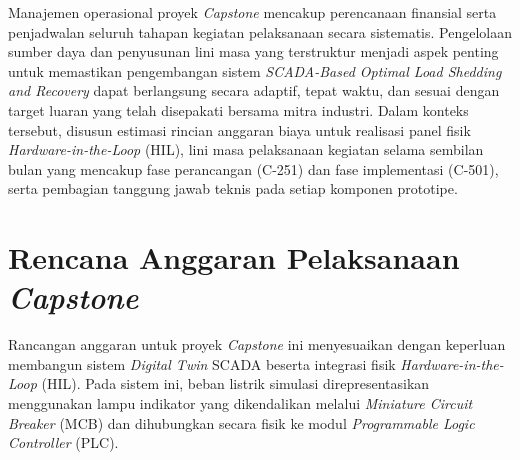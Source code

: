 
Manajemen operasional proyek \textit{Capstone} mencakup perencanaan finansial serta penjadwalan seluruh tahapan kegiatan pelaksanaan secara sistematis. Pengelolaan sumber daya dan penyusunan lini masa yang terstruktur menjadi aspek penting untuk memastikan pengembangan sistem \textit{SCADA-Based Optimal Load Shedding and Recovery} dapat berlangsung secara adaptif, tepat waktu, dan sesuai dengan target luaran yang telah disepakati bersama mitra industri. Dalam konteks tersebut, disusun estimasi rincian anggaran biaya untuk realisasi panel fisik \textit{Hardware-in-the-Loop} (HIL), lini masa pelaksanaan kegiatan selama sembilan bulan yang mencakup fase perancangan (C-251) dan fase implementasi (C-501), serta pembagian tanggung jawab teknis pada setiap komponen prototipe.

\section{Rencana Anggaran Pelaksanaan \textit{Capstone}}
\label{sec:Rencana_Anggaran}
Rancangan anggaran untuk proyek \textit{Capstone} ini menyesuaikan dengan keperluan membangun sistem \textit{Digital Twin} SCADA beserta integrasi fisik \textit{Hardware-in-the-Loop} (HIL). Pada sistem ini, beban listrik simulasi direpresentasikan menggunakan lampu indikator yang dikendalikan melalui \textit{Miniature Circuit Breaker} (MCB) dan dihubungkan secara fisik ke modul \textit{Programmable Logic Controller} (PLC). 

